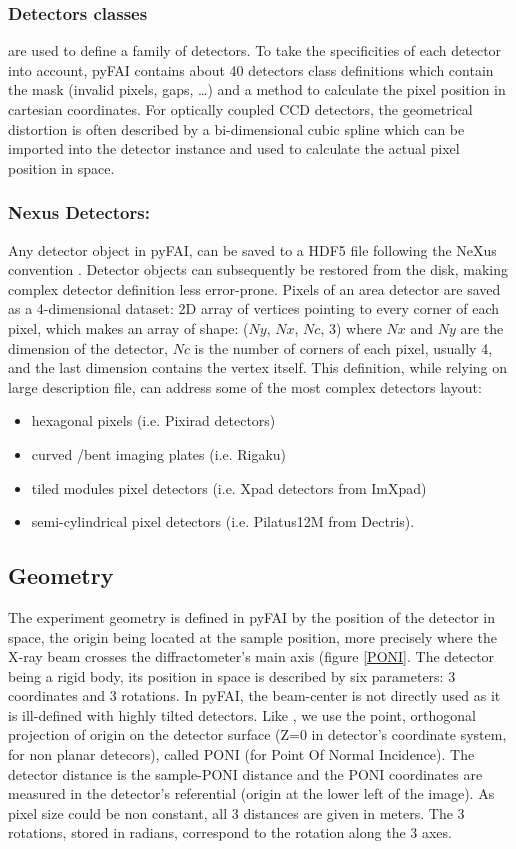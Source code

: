 \documentclass[preprint]{iucr}
\begin{document}
\subsubsection{Detectors classes} are used to define a family of detectors.
To take the specificities of each detector into account, pyFAI contains about
40 detectors class definitions which contain the mask (invalid pixels,
gaps, \ldots) and a method to calculate the pixel position in cartesian coordinates.
For optically coupled CCD detectors, the geometrical distortion is often
described by a bi-dimensional cubic spline which can be imported into
the detector instance and used to calculate the actual pixel position in space.

\subsubsection{Nexus Detectors:}
Any detector object in pyFAI, can be saved to a HDF5 file following the NeXus
 convention \cite{nexus}.
Detector objects can subsequently be restored from the disk, making
complex detector definition less error-prone.
Pixels of an area detector are saved as a 4-dimensional dataset: 2D
array of vertices pointing to every corner of each pixel, which makes an array
of shape: ($Ny$, $Nx$, $Nc$, 3) where $Nx$ and $Ny$ are the dimension of the
detector, $Nc$ is the number of corners of each pixel, usually 4, and the last
dimension contains the vertex itself.
This definition, while relying on large description file,
can address some of the most complex detectors layout:
\begin{itemize}
  \item hexagonal pixels (i.e. Pixirad detectors)
  \item curved /bent imaging plates (i.e. Rigaku)
  \item tiled modules pixel detectors (i.e. Xpad detectors from ImXpad)
  \item semi-cylindrical pixel detectors (i.e. Pilatus12M from Dectris).
\end{itemize}

\subsection{Geometry}
The experiment geometry is defined in pyFAI by the position of the detector in
space, the origin being located at the sample position, more precisely where the
X-ray beam crosses the diffractometer's main axis (figure \ref{PONI}.
The detector being a rigid body, its position in space is described by
six parameters: 3 coordinates and 3 rotations.
In pyFAI, the beam-center is not directly used as it is ill-defined with
highly tilted detectors.  
Like \cite{spd}, we use  the point, orthogonal projection of origin on
the detector surface (Z=0 in detector's coordinate system, for non planar detecors), 
called PONI (for Point Of Normal Incidence).
The detector distance is the sample-PONI distance
and the PONI coordinates are measured in the detector's referential (origin at the lower
left of the image). As pixel size could be non constant, all 3 distances are
given in meters.
The 3 rotations, stored in radians, correspond to the rotation along the 3
axes.
\end{document}
